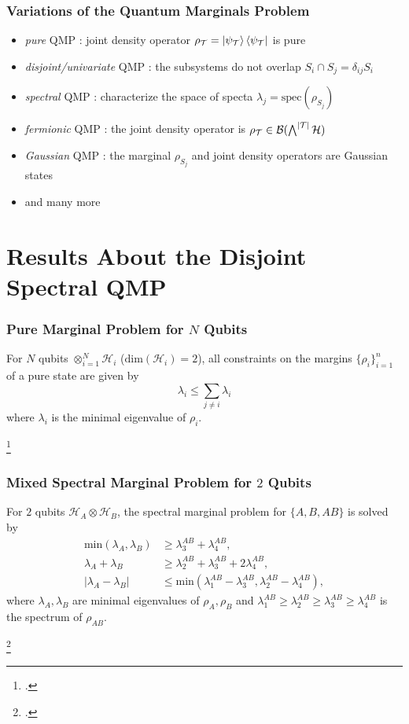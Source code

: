 \documentclass[
    9pt,
    hyperref={bookmarks=false, colorlinks=false}, %
    xcolor={dvipsnames},
]{beamer}
\begin{document}
\begin{frame}
    \frametitle{Variations of the Quantum Marginals Problem}
    \begin{itemize}
        \item \textit{pure} QMP : joint density operator $\rho_{\mathcal T} = \ket{\psi_{\mathcal T}}\bra{\psi_{\mathcal T}}$ is pure
        \item \textit{disjoint/univariate} QMP : the subsystems do not overlap $S_i \cap S_j = \delta_{ij} S_i$
        \item \textit{spectral} QMP : characterize the space of specta $\lambda_j  = \mathrm{spec}(\rho_{S_j})$
        \item \textit{fermionic} QMP : the joint density operator is $\rho_{\mathcal T} \in \mathcal B ( \bigwedge^{\abs{\mathcal T}} \mathcal H)$
        \item \textit{Gaussian} QMP : the marginal $\rho_{S_j}$ and joint density operators are Gaussian states
        \item and many more
    \end{itemize}
\end{frame}

\section{Results About the Disjoint Spectral QMP}
\begin{frame}
    \frametitle{Pure Marginal Problem for $N$ Qubits}
    \begin{theorem}
        For $N$ qubits $\otimes_{i=1}^{N} \mathcal H_i$ ($\mathrm{dim}(\mathcal H_i) = 2$), all constraints on the margins $\{ \rho_i \}_{i=1}^{n}$ of a pure state are given by 
        \[ \lambda_i \leq \sum_{j \neq i} \lambda_i \]
        where $\lambda_i$ is the minimal eigenvalue of $\rho_i$.
    \end{theorem}
    \footcitetext{higuchi2003one}
\end{frame}

\begin{frame}
    \frametitle{Mixed Spectral Marginal Problem for $2$ Qubits}
    \begin{theorem}
        For $2$ qubits $\mathcal H_A \otimes \mathcal H_B$, the spectral marginal problem for $\{ A, B, AB \}$ is solved by 
        \begin{align*}
            \mathrm{min}(\lambda_A, \lambda_B) &\geq \lambda_3^{AB} + \lambda_4^{AB}, \\
            \lambda_A + \lambda_B &\geq \lambda_2^{AB} + \lambda_3^{AB} + 2\lambda_4^{AB}, \\
            |\lambda_A - \lambda_B| &\leq \mathrm{min}(\lambda_1^{AB} - \lambda_3^{AB}, \lambda_2^{AB} - \lambda_4^{AB}),
        \end{align*}
        where $\lambda_A, \lambda_B$ are minimal eigenvalues of $\rho_A, \rho_B$ and $\lambda_1^{AB} \geq \lambda_{2}^{AB} \geq \lambda_{3}^{AB} \geq \lambda_{4}^{AB}$ is the spectrum of $\rho_{AB}$.
    \end{theorem}
    \footcitetext{bravyi2003requirements}
\end{frame}
\end{document}
